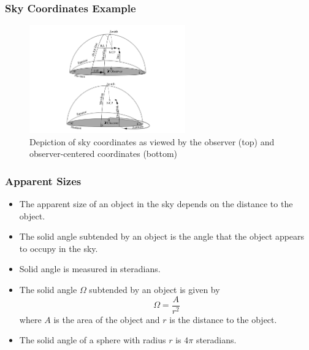 \documentclass[handout, %
	11pt, %
]{beamer}
\begin{document}
\begin{frame}
    \frametitle{Sky Coordinates Example}
    \begin{figure}
        \centering
        \includegraphics[width=0.6\textwidth]{Images/sky_coordinates_example.png}
        \caption{Depiction of sky coordinates as viewed by the observer (top) and observer-centered coordinates (bottom)}
        \label{fig:sky_coordinates_example}
    \end{figure}
\end{frame}

\begin{frame}
    \frametitle{Apparent Sizes}
    \begin{itemize}
        \item The apparent size of an object in the sky depends on the distance to the object.
        \item The solid angle subtended by an object is the angle that the object appears to occupy in the sky.
        \item Solid angle is measured in steradians.
        \item The solid angle $\Omega$ subtended by an object is given by 
        \[
            \Omega = \frac{A}{r^2} 
        \]
        where $A$ is the area of the object and $r$ is the distance to the object.
        \item The solid angle of a sphere with radius $r$ is $4\pi$ steradians.
    \end{itemize}
\end{frame}
\end{document}
